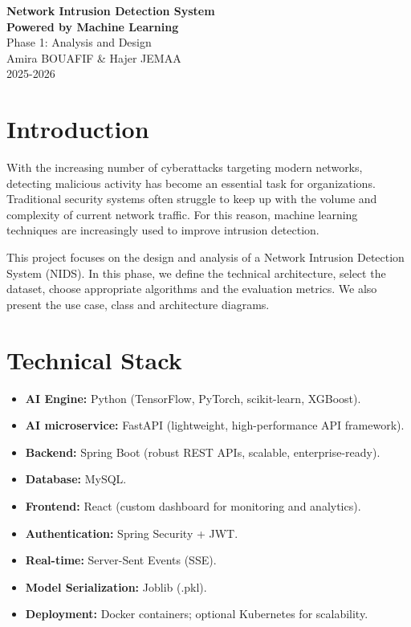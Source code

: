 \documentclass[12pt,a4paper]{article}
\begin{document}
\begin{titlepage}
  \centering
  \vspace*{6.5cm}
  {\LARGE \textbf{Network Intrusion Detection System} \\[0.5em]
    \textbf{Powered by Machine Learning}}\\[2cm]
  {\large Phase 1: Analysis and Design}\\[2cm]
  {\large Amira BOUAFIF \& Hajer JEMAA}\\[0.5cm]
  \vfill
  {\large 2025-2026}\\[1cm]
\end{titlepage}

\section*{Introduction}

With the increasing number of cyberattacks targeting modern networks, detecting malicious activity has become an essential task for organizations. Traditional security systems often struggle to keep up with the volume and complexity of current network traffic. For this reason, machine learning techniques are increasingly used to improve intrusion detection.

This project focuses on the design and analysis of a Network Intrusion Detection System (NIDS). In this phase, we define the technical architecture, select the dataset, choose appropriate algorithms and the evaluation metrics. We also present the use case, class and architecture diagrams.
\section{Technical Stack}
\begin{itemize}
  \item \textbf{AI Engine:} Python (TensorFlow, PyTorch, scikit-learn, XGBoost).
  \item \textbf{AI microservice:} FastAPI (lightweight, high-performance API framework).
  \item \textbf{Backend:} Spring Boot (robust REST APIs, scalable, enterprise-ready).
  \item \textbf{Database:} MySQL.
  \item \textbf{Frontend:} React (custom dashboard for monitoring and analytics).
  \item \textbf{Authentication:} Spring Security + JWT.
  \item \textbf{Real-time:} Server-Sent Events (SSE).
  \item \textbf{Model Serialization:} Joblib (.pkl).
  \item \textbf{Deployment:} Docker containers; optional Kubernetes for scalability.
\end{itemize}
\end{document}
